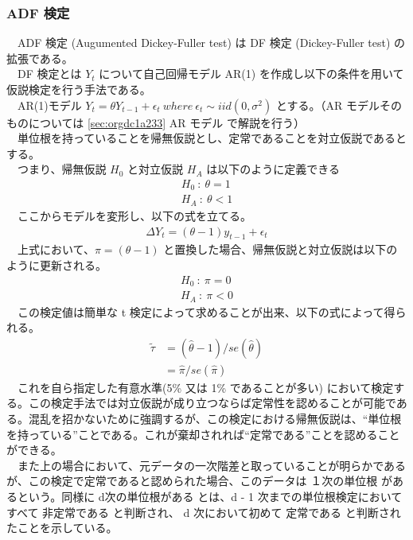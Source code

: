 \documentclass[dvipdfmx]{scrartcl}
\begin{document}
\newpage
\subsubsection{ADF 検定}
\label{sec:org0ed3ee7}
　ADF 検定 (Augumented Dickey-Fuller test) は DF 検定 (Dickey-Fuller test) の拡張である。\\
　DF 検定とは \(Y_t\) について自己回帰モデル AR(1) を作成し以下の条件を用いて仮説検定を行う手法である。\\
　AR(1)モデル \(Y_t = \theta Y_{t-1} + \epsilon_t \  where \ \epsilon_t \sim iid(0, \sigma^2)\) とする。（AR モデルそのものについては \ref{sec:orgdc1a233} AR モデル で解説を行う）\\
　単位根を持っていることを帰無仮説とし、定常であることを対立仮説であるとする。\\
　つまり、帰無仮説 \(H_0\) と対立仮説 \(H_A\) は以下のように定義できる\\
\begin{align}
H_0\ :\ \theta = 1 \\
H_A\ :\ \theta < 1
\end{align}
　ここからモデルを変形し、以下の式を立てる。\\
\begin{align}
\Delta Y_t = (\theta - 1) y_{t-1} + \epsilon_t   
\end{align}
　上式において、\(\pi = (\theta - 1)\) と置換した場合、帰無仮説と対立仮説は以下のように更新される。\\
\begin{align}
H_0\ :\ \pi = 0 \\
H_A\ :\ \pi < 0
\end{align}
　この検定値は簡単な t 検定によって求めることが出来、以下の式によって得られる。\\
    \begin{align}
\widetilde{\tau} &= (\hat{\theta} - 1) / {se(\hat{\theta})} \nonumber \\ 
                 &= \hat{\pi} / se(\hat{\pi})
    \end{align}
　これを自ら指定した有意水準(5\% 又は 1\% であることが多い) において検定する。この検定手法では対立仮説が成り立つならば定常性を認めることが可能である。混乱を招かないために強調するが、この検定における帰無仮説は、``単位根を持っている''ことである。これが棄却されれば``定常である''ことを認めることができる。\\
　また上の場合において、元データの一次階差と取っていることが明らかであるが、この検定で定常であると認められた場合、このデータは １次の単位根 があるという。同様に d次の単位根がある とは、d - 1 次までの単位根検定においてすべて 非定常である と判断され、 d 次において初めて 定常である と判断されたことを示している。\\
\end{document}
